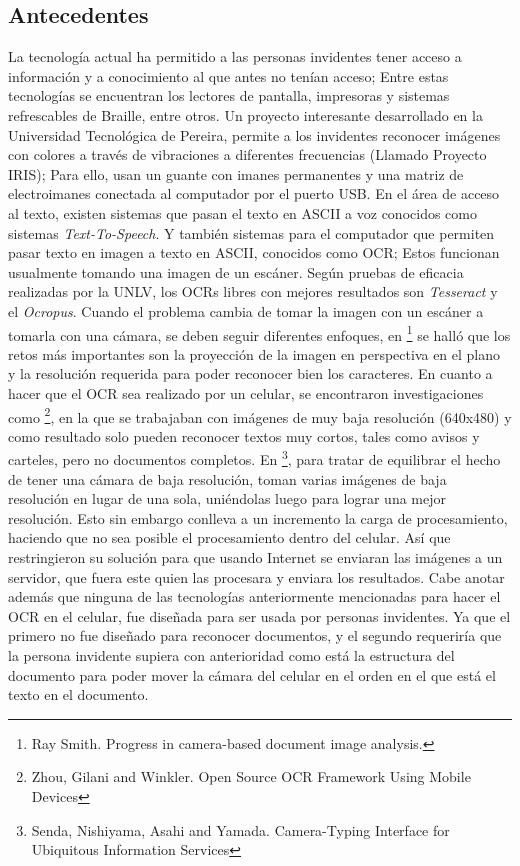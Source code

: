 \documentclass[a4paper, 11pt, oneside]{article}
\begin{document}
	\subsection {Antecedentes}
	La tecnología actual ha permitido a las personas invidentes tener acceso a información
	y a conocimiento al que antes no tenían acceso; Entre estas tecnologías se encuentran los
	lectores de pantalla, impresoras y sistemas refrescables de Braille, entre otros.
	Un proyecto interesante desarrollado en la Universidad Tecnológica de Pereira, permite
	a los invidentes reconocer imágenes con colores a través de vibraciones a diferentes
	frecuencias (Llamado Proyecto IRIS); Para ello, usan un guante con imanes 
	permanentes y una matriz de electroimanes conectada al computador por el puerto USB.
	\newline \newline
	En el área de acceso al texto, existen sistemas que pasan el texto en ASCII a voz
	conocidos como sistemas \textit{Text-To-Speech}. Y también sistemas para el computador
	que permiten pasar texto en imagen a texto en ASCII, conocidos como OCR; Estos funcionan
	usualmente tomando una imagen de un escáner. Según pruebas de eficacia realizadas por
	la UNLV, los OCRs libres con mejores resultados son	\textit{Tesseract} y el 
	\textit{Ocropus}. Cuando el problema cambia de tomar la imagen con un escáner a tomarla
	con una cámara, se deben seguir diferentes enfoques, en 
	\footnote{Ray Smith. Progress in camera-based document image analysis.} se halló que los
	retos más importantes son la proyección de la imagen en perspectiva en el plano y la 
	resolución requerida para poder reconocer bien los caracteres.
	En cuanto a hacer que el OCR sea realizado por un celular, se encontraron investigaciones
	como \footnote{Zhou, Gilani and Winkler. Open Source OCR Framework Using Mobile Devices}, 
	en la que se trabajaban con imágenes de muy baja resolución (640x480) y como resultado solo
    pueden reconocer textos muy cortos, tales como avisos
	y carteles,	pero no documentos completos.
	En \footnote{Senda, Nishiyama, Asahi and Yamada. Camera-Typing Interface for Ubiquitous
	Information Services}, para tratar de equilibrar el hecho de tener una cámara de baja
	resolución, toman varias imágenes de baja resolución en lugar de una sola, uniéndolas
	luego para lograr una mejor resolución. Esto sin embargo conlleva a un incremento la
	carga de procesamiento, haciendo que no sea posible el procesamiento dentro del celular.
	Así que restringieron su solución para que usando Internet se enviaran las imágenes a un
	servidor, que fuera este quien las procesara y enviara los resultados.\newline
	Cabe anotar además que ninguna de las tecnologías anteriormente mencionadas para hacer
	el OCR en el celular, fue diseñada para ser usada por personas invidentes. Ya que el 
	primero no fue diseñado para reconocer documentos, y el segundo requeriría que la persona
	invidente supiera con anterioridad como está la estructura del documento para poder mover
	la cámara del celular en el orden en el que está el texto en el documento.
	
\end{document}
